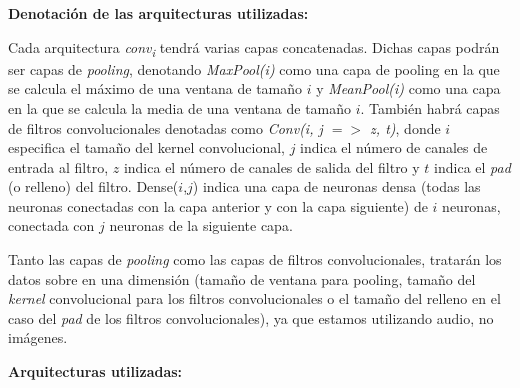 \documentclass[12pt]{article}
\begin{document}
\bigskip

\textbf{Denotación de las arquitecturas utilizadas:}

\bigskip
Cada arquitectura \textit{conv\textsubscript{i}} tendrá varias capas concatenadas. Dichas capas podrán ser capas
de \textit{pooling}, denotando \textit{MaxPool(i)} como  una capa de pooling en la que se calcula el máximo de
una ventana de tamaño $i$ y \textit{MeanPool(i)} como una capa en la que se calcula la media de una ventana
de tamaño $i$. También habrá capas de filtros convolucionales denotadas como \textit{Conv(i, j $=>$ z, t)}, donde $i$ 
especifica el tamaño del kernel convolucional, $j$ indica el número de canales de entrada al filtro, 
$z$ indica el número de canales de salida del filtro y $t$ indica el \textit{pad} (o relleno) del filtro.
Dense($i$,$j$) indica una capa de neuronas densa (todas las neuronas conectadas con la capa anterior
y con la capa siguiente) de $i$ neuronas, conectada con $j$ neuronas de la siguiente capa.

\bigskip
Tanto las capas de \textit{pooling} como las capas de filtros convolucionales, tratarán los datos sobre
en una dimensión (tamaño de ventana para pooling, tamaño del \textit{kernel} convolucional para los filtros convolucionales o el
tamaño del relleno en el caso del \textit{pad} de los filtros convolucionales),
ya que estamos utilizando audio, no imágenes.

\bigskip
\textbf{Arquitecturas utilizadas:}
\end{document}
